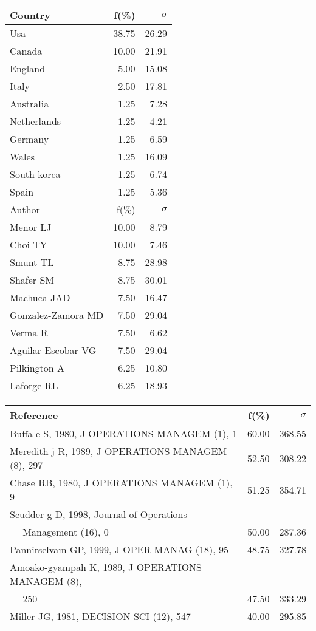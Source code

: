 \documentclass[a4paper,11pt]{report}
\begin{document}
\begin{landscape}
\begin{table}[!ht]
{\begin{tabular}{|l r r|}
\hline
\hline
Country & f(\%) & $\sigma$\\
\hline
Usa & 38.75 & 26.29\\
Canada & 10.00 & 21.91\\
England & 5.00 & 15.08\\
Italy & 2.50 & 17.81\\
Australia & 1.25 & 7.28\\
Netherlands & 1.25 & 4.21\\
Germany & 1.25 & 6.59\\
Wales & 1.25 & 16.09\\
South korea & 1.25 & 6.74\\
Spain & 1.25 & 5.36\\
\hline
\hline
Author & f(\%) & $\sigma$\\
\hline
Menor LJ & 10.00 & 8.79\\
Choi TY & 10.00 & 7.46\\
Smunt TL & 8.75 & 28.98\\
Shafer SM & 8.75 & 30.01\\
Machuca JAD & 7.50 & 16.47\\
Gonzalez-Zamora MD & 7.50 & 29.04\\
Verma R & 7.50 & 6.62\\
Aguilar-Escobar VG & 7.50 & 29.04\\
Pilkington A & 6.25 & 10.80\\
Laforge RL & 6.25 & 18.93\\
\hline
\end{tabular}
}
{\scriptsize\begin{tabular}{|l r r|}
\hline
Reference & f(\%) & $\sigma$\\
\hline
Buffa e S, 1980, J OPERATIONS MANAGEM (1), 1 & 60.00 & 368.55\\
Meredith j R, 1989, J OPERATIONS MANAGEM (8), 297 & 52.50 & 308.22\\
Chase RB, 1980, J OPERATIONS MANAGEM (1), 9 & 51.25 & 354.71\\
Scudder g D, 1998, Journal of Operations &  & \\
$\quad$ Management (16), 0 & 50.00 & 287.36\\
Pannirselvam GP, 1999, J OPER MANAG (18), 95 & 48.75 & 327.78\\
Amoako-gyampah K, 1989, J OPERATIONS MANAGEM (8), &  & \\
$\quad$ 250 & 47.50 & 333.29\\
Miller JG, 1981, DECISION SCI (12), 547 & 40.00 & 295.85\\

\end{tabular}}
\end{table}
\end{landscape}
\end{document}

